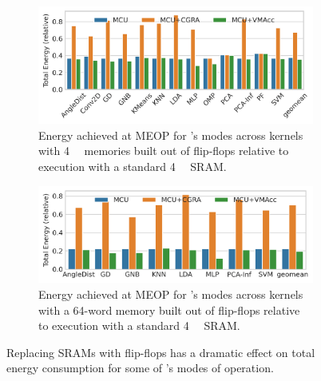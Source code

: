 \begin{figure}
    \centering
    \begin{subfigure}{\linewidth}
        \includegraphics[width=1.0\linewidth]
            {./figs/4KB_tech.png}
        \caption{
            \small Energy achieved at MEOP for \arch{}'s modes across kernels
            with \SI{4}{\kibi\byte} memories built out of flip-flops relative
            to execution with a standard \SI{4}{\kibi\byte} SRAM.
        }
        \label{fig:four_kb_tech}
    \end{subfigure}

    \begin{subfigure}{\linewidth}
        \includegraphics[width=1.0\linewidth]
            {./figs/scratchpad_energy.png}
        \caption{
            \small Energy achieved at MEOP for \arch{}'s modes across kernels
            with a 64-word memory built out of flip-flops relative to
            execution with a standard \SI{4}{\kibi\byte} SRAM.
        }
        \label{fig:scratch_tech}
    \end{subfigure}
    \caption{Replacing SRAMs with flip-flops has a dramatic effect on
    total energy consumption for some of \arch{}'s modes of operation.}
    \label{fig:sram_ff}
\end{figure}


